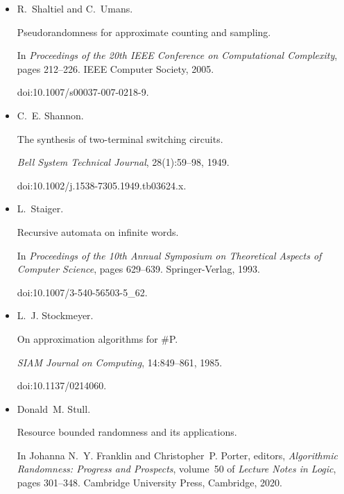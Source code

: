 \documentclass[10pt,a4paper]{article}
\begin{document}
\begin{itemize}
doi:10.1007/978-1-4612-4478-3\_9.





\item[] 
[70]

R. Shaltiel and C. Umans.


Pseudorandomness for approximate counting and sampling.


In \emph{Proceedings of the 20th IEEE Conference on Computational
Complexity}, pages 212–226. IEEE Computer Society, 2005.


doi:10.1007/s00037-007-0218-9.





\item[] 
[71]

C. E. Shannon.


The synthesis of two-terminal switching circuits.


\emph{Bell System Technical Journal}, 28(1):59–98, 1949.


doi:10.1002/j.1538-7305.1949.tb03624.x.





\item[] 
[72]

L. Staiger.


Recursive automata on infinite words.


In \emph{Proceedings of the 10th Annual Symposium on Theoretical
Aspects of Computer Science}, pages 629–639. Springer-Verlag, 1993.


doi:10.1007/3-540-56503-5\_62.





\item[] 
[73]

L. J. Stockmeyer.


On approximation algorithms for \#P.


\emph{SIAM Journal on Computing}, 14:849–861, 1985.


doi:10.1137/0214060.





\item[] 
[74]

Donald M. Stull.


Resource bounded randomness and its applications.


In Johanna N. Y. Franklin and Christopher P. Porter, editors, \emph{Algorithmic Randomness: Progress and Prospects}, volume 50 of \emph{Lecture
Notes in Logic}, pages 301–348. Cambridge University Press, Cambridge, 2020.



\end{itemize}
\end{document}
